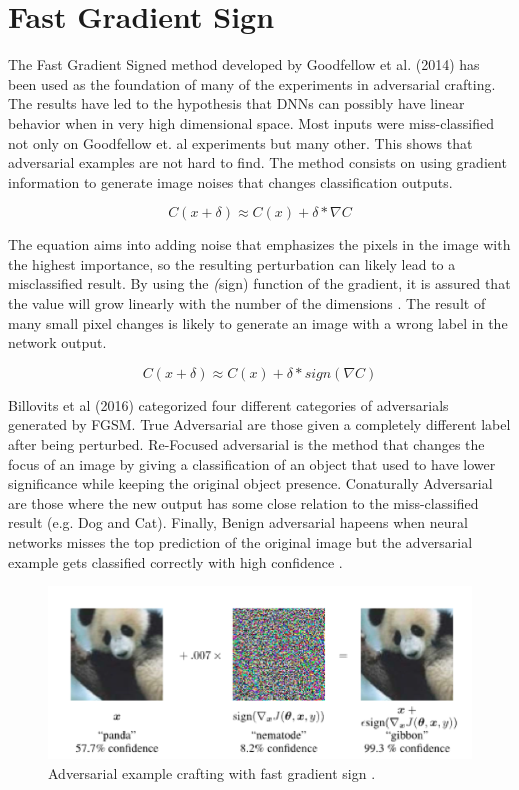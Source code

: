 \section{Fast Gradient Sign}

The Fast Gradient Signed method developed by Goodfellow et al. (2014) has been used as the foundation of many of the experiments in adversarial crafting. The results have led to the hypothesis that DNNs can possibly have linear behavior when in very high dimensional space.  Most inputs were miss-classified not only on Goodfellow et. al \cite{goodfellow2014}  experiments but many other. This shows that adversarial examples are not hard to find. The method consists on using gradient information to generate image noises that changes classification outputs.

$$ C(x + \delta)\approx C(x) + \delta * \nabla C$$

The equation aims into adding noise that emphasizes the pixels in the image with the highest importance, so the resulting perturbation can likely lead to a misclassified result. By using the \textit(sign) function of the gradient, it is assured that the value will grow linearly with the number of the dimensions \cite{goodfellow2014}. The result of many small pixel changes is likely to generate an image with a wrong label in the network output.

$$ C(x + \delta)\approx C(x) + \delta * sign(\nabla C)$$

Billovits et al (2016) categorized four different categories of adversarials generated by FGSM. True Adversarial are those given a completely different label after being perturbed. Re-Focused adversarial is the method that changes the focus of an image by giving a classification of an object that used to have lower significance while keeping the original object presence. Conaturally Adversarial are those where the new output has some close relation to the miss-classified result (e.g. Dog and Cat). Finally, Benign adversarial hapeens when neural networks misses the top prediction of the original image but the adversarial example gets classified correctly with high confidence \cite{billovits}.

\begin{figure}[!h]
\centering
	\includegraphics[scale=0.6]{panda.png}
\caption{Adversarial example crafting with fast gradient sign \cite{goodfellow2014}.}
\label{fig:fgsm_craft}
\end{figure}

